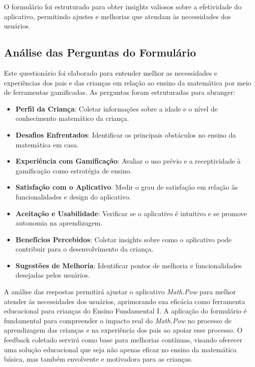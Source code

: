 O formulário foi estruturado para obter insights valiosos sobre a efetividade do aplicativo, permitindo ajustes e melhorias que atendam às necessidades dos usuários.

\subsection{Análise das Perguntas do Formulário}

Este questionário foi elaborado para entender melhor as necessidades e experiências dos pais e das crianças em relação ao ensino da matemática por meio de ferramentas gamificadas. As perguntas foram estruturadas para abranger:

\begin{itemize}
    \item \textbf{Perfil da Criança}: Coletar informações sobre a idade e o nível de conhecimento matemático da criança.
    \item \textbf{Desafios Enfrentados}: Identificar os principais obstáculos no ensino da matemática em casa.
    \item \textbf{Experiência com Gamificação}: Avaliar o uso prévio e a receptividade à gamificação como estratégia de ensino.
    \item \textbf{Satisfação com o Aplicativo}: Medir o grau de satisfação em relação às funcionalidades e design do aplicativo.
    \item \textbf{Aceitação e Usabilidade}: Verificar se o aplicativo é intuitivo e se promove autonomia na aprendizagem.
    \item \textbf{Benefícios Percebidos}: Coletar insights sobre como o aplicativo pode contribuir para o desenvolvimento da criança.
    \item \textbf{Sugestões de Melhoria}: Identificar pontos de melhoria e funcionalidades desejadas pelos usuários.
\end{itemize}

A análise das respostas permitirá ajustar o aplicativo \textit{Math.Pow} para melhor atender às necessidades dos usuários, aprimorando sua eficácia como ferramenta educacional para crianças do Ensino Fundamental I.
A aplicação do formulário é fundamental para compreender o impacto real do \textit{Math.Pow} no processo de aprendizagem das crianças e na experiência dos pais ao apoiar esse processo. O feedback coletado servirá como base para melhorias contínuas, visando oferecer uma solução educacional que seja não apenas eficaz no ensino da matemática básica, mas também envolvente e motivadora para as crianças.
